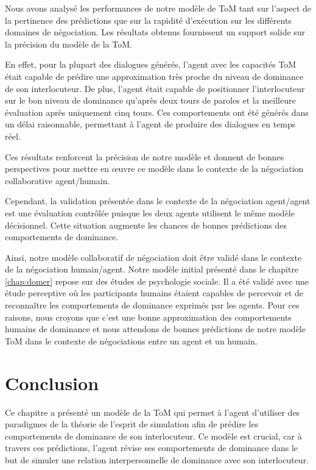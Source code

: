 	Nous avons analysé les performances de notre modèle de ToM tant sur l'aspect de la pertinence des prédictions que sur la rapidité d'exécution sur les différents domaines de négociation. Les résultats obtenus fournissent un support solide sur la précision du modèle de la ToM.
	
	En effet, pour la plupart des dialogues générés, l'agent avec les capacités ToM était capable de prédire une approximation très proche du niveau de dominance de son interlocuteur. De plus, l'agent était capable de positionner l'interlocuteur sur le bon niveau de dominance qu'après deux tours de paroles et la meilleure évaluation après uniquement cinq tours. Ces comportements ont été générés dans un délai raisonnable, permettant à l'agent de produire des dialogues en temps réel.
	
	Ces résultats renforcent la précision de notre modèle et donnent de bonnes perspectives pour mettre en œuvre ce modèle dans le contexte de la négociation collaborative agent/humain. 
	
	Cependant, la validation présentée dans le contexte de la négociation agent/agent est une évaluation contrôlée puisque les deux agents utilisent le même modèle décisionnel. Cette situation augmente les chances de bonnes prédictions des comportements de dominance.
	
	Ainsi, notre modèle collaboratif de négociation doit être validé dans le contexte de la négociation humain/agent. Notre modèle initial présenté dans le chapitre \ref{chap:domer} repose sur des études de psychologie sociale. Il a été validé avec une étude perceptive où les participants humains étaient capables de percevoir et de reconnaître les comportements de dominance exprimés par les agents. Pour ces raisons, nous croyons que c'est une bonne approximation des comportements humains de dominance et nous attendons de bonnes prédictions de notre modèle ToM dans le contexte de négociations entre un agent et un humain.
	
	\section{Conclusion}
	
	Ce chapitre a présenté un modèle de la ToM qui permet à l'agent d'utiliser des paradigmes de la théorie de l'esprit de simulation afin de prédire les comportements de dominance de son interlocuteur. Ce modèle est crucial, car à travers ces prédictions, l'agent révise ses comportements de dominance dans le but de simuler une relation interpersonnelle de dominance avec son interlocuteur. 
	
